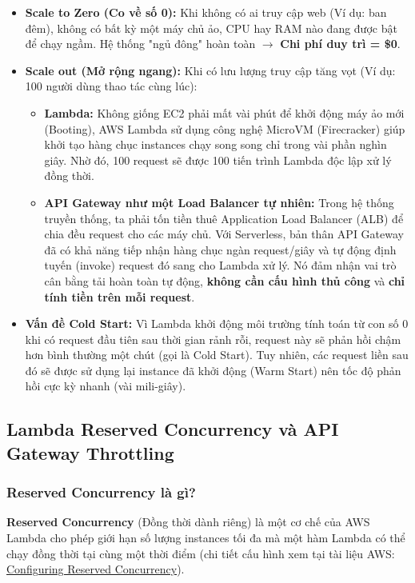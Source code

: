 \documentclass[13pt]{article}
\begin{document}
\begin{itemize}
    \item \textbf{Scale to Zero (Co về số 0):} Khi không có ai truy cập web (Ví dụ: ban đêm), không có bất kỳ một máy chủ ảo, CPU hay RAM nào đang được bật để chạy ngầm. Hệ thống "ngủ đông" hoàn toàn $\rightarrow$ \textbf{Chi phí duy trì = \$0}.
    \item \textbf{Scale out (Mở rộng ngang):} Khi có lưu lượng truy cập tăng vọt (Ví dụ: 100 người dùng thao tác cùng lúc):
    \begin{itemize}
        \item \textbf{Lambda:} Không giống EC2 phải mất vài phút để khởi động máy ảo mới (Booting), AWS Lambda sử dụng công nghệ MicroVM (Firecracker) giúp khởi tạo hàng chục instances chạy song song chỉ trong vài phần nghìn giây. Nhờ đó, 100 request sẽ được 100 tiến trình Lambda độc lập xử lý đồng thời.
        \item \textbf{API Gateway như một Load Balancer tự nhiên:} Trong hệ thống truyền thống, ta phải tốn tiền thuê Application Load Balancer (ALB) để chia đều request cho các máy chủ. Với Serverless, bản thân API Gateway đã có khả năng tiếp nhận hàng chục ngàn request/giây và tự động định tuyến (invoke) request đó sang cho Lambda xử lý. Nó đảm nhận vai trò cân bằng tải hoàn toàn tự động, \textbf{không cần cấu hình thủ công} và \textbf{chỉ tính tiền trên mỗi request}.
    \end{itemize}
    \item \textbf{Vấn đề Cold Start:} Vì Lambda khởi động môi trường tính toán từ con số 0 khi có request đầu tiên sau thời gian rảnh rỗi, request này sẽ phản hồi chậm hơn bình thường một chút (gọi là Cold Start). Tuy nhiên, các request liền sau đó sẽ được sử dụng lại instance đã khởi động (Warm Start) nên tốc độ phản hồi cực kỳ nhanh (vài mili-giây).
\end{itemize}

\subsection{Lambda Reserved Concurrency và API Gateway Throttling}

\subsubsection{Reserved Concurrency là gì?}
\textbf{Reserved Concurrency} (Đồng thời dành riêng) là một cơ chế của AWS Lambda cho phép giới hạn số lượng instances tối đa mà một hàm Lambda có thể chạy đồng thời tại cùng một thời điểm (chi tiết cấu hình xem tại tài liệu AWS: \href{https://docs.aws.amazon.com/lambda/latest/dg/configuration-concurrency.html}{Configuring Reserved Concurrency}).
\end{document}
